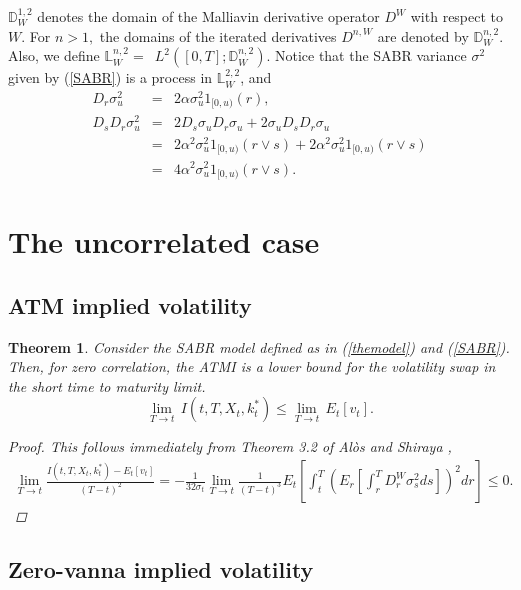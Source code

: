 \documentclass[11pt]{article}
\newtheorem{theorem}{Theorem}
\begin{document}
$\mathbb{D}_{W}^{1,2}$ denotes the domain of the
Malliavin derivative operator $D^{W}$ with respect to $W$.
For $n>1,$ the domains of the iterated derivatives $D^{n,W}$ are denoted by 
$\mathbb{D}_{W}^{n,2}$. Also, we define $\mathbb{L}_{W}^{n,2}=$\ $L^{2}(\left[ 0,T\right] ;\mathbb{D}_{W}^{n,2})$. Notice that the SABR variance $\sigma^2$ given by (\ref{SABR}) is a process in $\mathbb{L}_{W}^{2,2}$, and 
\begin{eqnarray}
D_r\sigma_u^2 &=& 2\alpha \sigma_u^2 1_{[0,u)}(r),\\
D_s D_r \sigma_u^2 &=& 2 D_s\sigma_u D_r\sigma_u + 2\sigma_u D_s D_r \sigma_u\nonumber\\
&=& 2 \alpha^2 \sigma_u^2 1_{[0,u)}(r \vee s) + 2 \alpha^2 \sigma_u^2 1_{[0,u)}(r \vee s)\nonumber\\
&=& 4 \alpha^2 \sigma_u^2 1_{[0,u)}(r \vee s).
\end{eqnarray}

\section{The uncorrelated case}

\subsection{ATM implied volatility}
\begin{theorem} Consider the SABR model defined as in (\ref{themodel}) and (\ref{SABR}). Then, for zero correlation, the ATMI is a lower bound for the volatility swap in the short time to maturity limit.
\begin{equation}
\lim_{T \to t} \, I( t,T,X_t,k^*_t) \leq \lim_{T \to t} \,  E_{t}[v_{t}].
\end{equation}
\begin{proof}
This follows immediately from Theorem 3.2 of Al\`os and Shiraya \cite{AS},
\begin{eqnarray}
\lim_{T\rightarrow t}\frac{I\left( t,T,X_t,k^*_t\right) -E_{t}\left[v_{t}\right] }{(T-t)^{2}}
= -\frac{1}{32\sigma _{t}}\lim_{T\rightarrow t}
\frac{1}{(T-t)^{3}}E_{t}\left[\int_{t}^{T}\left(E_{r}\left[\int_{r}^{T}D_{r}^{W}\sigma_{s}^{2}ds\right]\right) ^{2}dr\right] \le 0.
\end{eqnarray}
\end{proof}
\end{theorem}


\subsection{Zero-vanna implied volatility}
\end{document}
